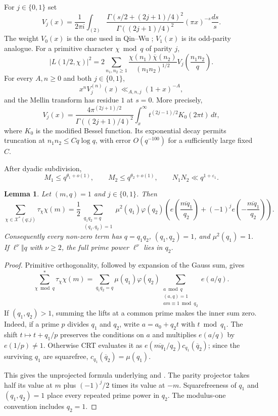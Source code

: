 \documentclass[12pt, a4paper]{amsart}
\numberwithin{equation}{section}
\newcommand{\e}{e}
\renewcommand{\bar}[1]{\overline{#1}}
\renewcommand{\le}{\leqslant}
\renewcommand{\ge}{\geqslant}
\theoremstyle{plain}
\newtheorem{lem}{Lemma}[section]
\begin{document}
For $j\in\{0,1\}$ set
$$
V_j(x)=\frac{1}{2\pi i}\int_{(2)}
\frac{\Gamma(s/2+(2j+1)/4)^2}
{\Gamma((2j+1)/4)^2}
(\pi x)^{-s}\frac{ds}{s}.
$$
The weight $V_0(x)$ is the one used in Qin--Wu \cite[(3.2)]{QW}; $V_1(x)$ is its odd-parity analogue. For a primitive character $\chi\bmod q$ of parity $j$,
$$
|L(1/2,\chi)|^2
=
2\sum_{n_1,n_2\ge1}
\frac{\chi(n_1)\overline\chi(n_2)}{(n_1n_2)^{1/2}}
V_j\left(\frac{n_1n_2}{q}\right).
$$
For every $A,n\ge0$ and both $j\in\{0,1\}$,
\begin{equation}\label{eq:V-derivative-bounds}
x^n V_j^{(n)}(x)\ll_{A,n,j} (1+x)^{-A},
\end{equation}
and the Mellin transform has residue $1$ at $s=0$. More precisely,
$$
V_j(x)=\frac{4\pi^{(2j+1)/2}}{\Gamma((2j+1)/4)^2}
\int_x^\infty t^{(2j-1)/2}K_0(2\pi t)\,dt,
$$
where $K_0$ is the modified Bessel function. Its exponential decay permits truncation at $n_1n_2\le Cq\log q$, with error $O(q^{-100})$ for a sufficiently large fixed $C$.

After dyadic subdivision,
$$
M_1\le q^{\theta_1+o(1)},\qquad
M_2\le q^{\theta_2+o(1)},\qquad
N_1N_2\ll q^{1+\varepsilon_1}.
$$
\begin{lem}\label{lem:primitive-factorisation}
Let $(m,q)=1$ and $j\in\{0,1\}$. Then
$$
\sum_{\chi\in\mathcal X^*(q;j)}\tau_\chi\chi(m)
=
\frac12\sum_{\substack{q_1q_2=q\\ (q_1,q_2)=1}}
\mu^2(q_1)\varphi(q_2)
\left(\e\left({\frac{\overline{mq_1}}{q_2}}\right)
+(-1)^j
\e\left({-\frac{\overline{mq_1}}{q_2}}\right)\right).
$$
Consequently every non-zero term has $q=q_1q_2$, $(q_1,q_2)=1$, and $\mu^2(q_1)=1$. If $\ell^\nu\Vert q$ with $\nu\ge2$, the full prime power $\ell^\nu$ lies in $q_2$.
\end{lem}

\begin{proof}
Primitive orthogonality, followed by expansion of the Gauss sum, gives
$$
\sum_{\chi\bmod q}^{*}\tau_\chi\chi(m)
=
\sum_{q_1q_2=q}\mu(q_1)\varphi(q_2)
\sum_{\substack{a\bmod q\\(a,q)=1\\ am\equiv1\bmod {q_2}}}
\e(a/q).
$$
If $(q_1,q_2)>1$, summing the lifts at a common prime makes the inner sum zero. Indeed, if a prime $p$ divides $q_1$ and $q_2$, write $a=a_0+q_2t$ with $t\bmod q_1$. The shift $t\mapsto t+q_1/p$ preserves the conditions on $a$ and multiplies $\e(a/q)$ by $\e(1/p)\ne1$. Otherwise CRT evaluates it as $\e(\overline{mq_1}/q_2)c_{q_1}(\bar q_2)$; since the surviving $q_1$ are squarefree, $c_{q_1}(\bar q_2)=\mu(q_1)$.

This gives the unprojected formula underlying \cite[(3.3)]{QW} and \cite[(17)]{MV}. The parity projector takes half its value at $m$ plus $(-1)^j/2$ times its value at $-m$. Squarefreeness of $q_1$ and $(q_1,q_2)=1$ place every repeated prime power in $q_2$. The modulus-one convention includes $q_2=1$.
\end{proof}
\end{document}
